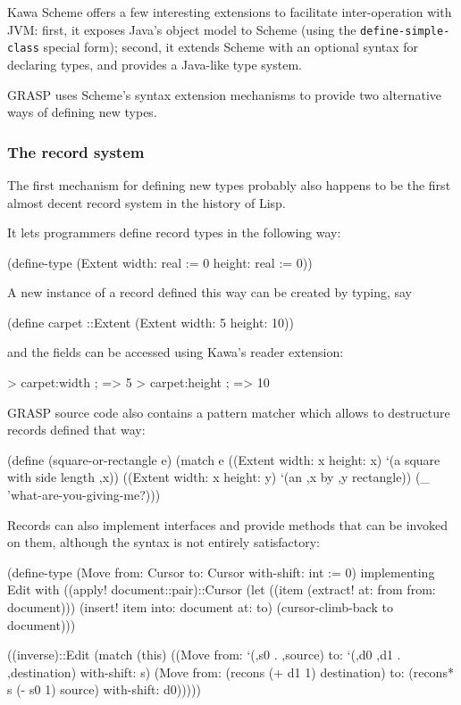 \documentclass[sigconf]{acmart}
\newenvironment{Snippet}{\Verbatim[samepage=true]}{\endVerbatim}
\begin{document}
Kawa Scheme offers a few interesting extensions
to facilitate inter-operation with JVM: first,
it exposes Java's object model to Scheme
(using the \texttt{define-simple-class} special form);
second, it extends Scheme with an optional syntax
for declaring types, and provides a Java-like type
system.

GRASP uses Scheme's syntax extension mechanisms
to provide two alternative ways of defining new
types.

\subsubsection{The record system}

The first mechanism for defining new types 
probably also happens to be the first almost decent
record system in the history of Lisp.

It lets programmers define record types in the following
way:

\begin{Snippet}
(define-type (Extent width: real := 0
		     height: real := 0))
\end{Snippet}

A new instance of a record defined this way can be
created by typing, say

\begin{Snippet}
(define carpet ::Extent (Extent width: 5 height: 10))
\end{Snippet}

and the fields can be accessed using Kawa's reader
extension:

\begin{Snippet}
> carpet:width ; => 5
> carpet:height ; => 10
\end{Snippet}

GRASP source code also contains a pattern matcher
which allows to destructure records defined that way:

\begin{Snippet}
(define (square-or-rectangle e)
  (match e
    ((Extent width: x height: x)
     `(a square with side length ,x))
    ((Extent width: x height: y)
     `(an ,x by ,y rectangle))
    (_
     'what-are-you-giving-me?)))
\end{Snippet}

Records can also implement interfaces and provide methods
that can be invoked on them, although the syntax is not 
entirely satisfactory:

\begin{Snippet}
(define-type (Move from: Cursor
		   to: Cursor
		   with-shift: int := 0)
  implementing Edit
  with
  ((apply! document::pair)::Cursor
   (let ((item (extract! at: from from: document)))
     (insert! item into: document at: to)
     (cursor-climb-back to document)))

  ((inverse)::Edit
   (match (this)
     ((Move from: `(,s0 . ,source)
	    to: `(,d0 ,d1 . ,destination)
	    with-shift: s)
      (Move from: (recons (+ d1 1) destination)
	    to: (recons* s (- s0 1) source)
	    with-shift: d0)))))
\end{Snippet}
\end{document}
